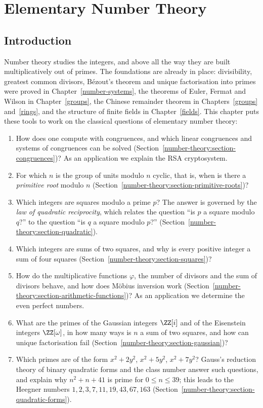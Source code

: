 \chapter{Elementary Number Theory}\label{number-theory}

\section{Introduction}\label{number-theory:section-introduction}

Number theory studies the integers, and above all the way they are built multiplicatively out of primes. The foundations are already in place: divisibility, greatest common divisors,
B\'ezout's theorem and unique factorisation into primes were proved in Chapter~\ref{number-systems}, the theorems of Euler, Fermat and Wilson in Chapter~\ref{groups}, the Chinese remainder theorem
in Chapters~\ref{groups} and~\ref{rings}, and the structure of finite fields in Chapter~\ref{fields}. This chapter puts these tools to work on the classical questions of elementary number theory:
\begin{enumerate}
\item How does one compute with congruences, and which linear congruences and systems of congruences can be solved (Section~\ref{number-theory:section-congruences})? As an application we explain the RSA
cryptosystem.
\item For which $n$ is the group of units modulo $n$ cyclic, that is, when is there a \emph{primitive root} modulo $n$ (Section~\ref{number-theory:section-primitive-roots})?
\item Which integers are squares modulo a prime $p$? The answer is governed by the \emph{law of quadratic reciprocity}, which relates the question ``is $p$ a square modulo $q$?'' to the question ``is $q$ a square
modulo $p$?'' (Section~\ref{number-theory:section-quadratic}).
\item Which integers are sums of two squares, and why is every positive integer a sum of four squares (Section~\ref{number-theory:section-squares})?
\item How do the multiplicative functions $\varphi$, the number of divisors and the sum of divisors behave, and how does M\"obius inversion work (Section~\ref{number-theory:section-arithmetic-functions})? As
an application we determine the even perfect numbers.
\item What are the primes of the Gaussian integers $\ZZ[i]$ and of the Eisenstein integers $\ZZ[\omega]$, in how many ways is $n$ a sum of two squares, and how can unique factorisation fail
(Section~\ref{number-theory:section-gaussian})?
\item Which primes are of the form $x^2 + 2y^2$, $x^2 + 5y^2$, $x^2 + 7y^2$? Gauss's reduction theory of binary quadratic forms and the class number answer such questions, and explain why
$n^2 + n + 41$ is prime for $0 \leq n \leq 39$; this leads to the Heegner numbers $1, 2, 3, 7, 11, 19, 43, 67, 163$ (Section~\ref{number-theory:section-quadratic-forms}).
\end{enumerate}
